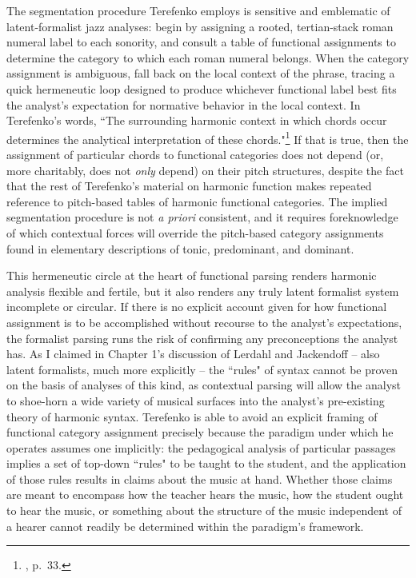 The segmentation procedure Terefenko employs is sensitive and emblematic of latent-formalist jazz analyses: begin by assigning a rooted, tertian-stack roman numeral label to each sonority, and consult a table of functional assignments to determine the category to which each roman numeral belongs.  When the category assignment is ambiguous, fall back on the local context of the phrase, tracing a quick hermeneutic loop designed to produce whichever functional label best fits the analyst's expectation for normative behavior in the local context.  In Terefenko's words, ``The surrounding harmonic context in which chords occur determines the analytical interpretation of these chords."\footnote{\cite{terefenko2014}, p.\ 33.}  If that is true, then the assignment of particular chords to functional categories does not depend (or, more charitably, does not \emph{only} depend) on their pitch structures, despite the fact that the rest of Terefenko's material on harmonic function makes repeated reference to pitch-based tables of harmonic functional categories.  The implied segmentation procedure is not \emph{a priori} consistent, and it requires foreknowledge of which contextual forces will override the pitch-based category assignments found in elementary descriptions of tonic, predominant, and dominant.

This hermeneutic circle at the heart of functional parsing renders harmonic analysis flexible and fertile, but it also renders any truly latent formalist system incomplete or circular.  If there is no explicit account given for how functional assignment is to be accomplished without recourse to the analyst's expectations, the formalist parsing runs the risk of confirming any preconceptions the analyst has.  As I claimed in Chapter 1's discussion of Lerdahl and Jackendoff -- also latent formalists, much more explicitly -- the ``rules" of syntax cannot be proven on the basis of analyses of this kind, as contextual parsing will allow the analyst to shoe-horn a wide variety of musical surfaces into the analyst's pre-existing theory of harmonic syntax.  Terefenko is able to avoid an explicit framing of functional category assignment precisely because the paradigm under which he operates assumes one implicitly: the pedagogical analysis of particular passages implies a set of top-down ``rules" to be taught to the student, and the application of those rules results in claims about the music at hand.  Whether those claims are meant to encompass how the teacher hears the music, how the student ought to hear the music, or something about the structure of the music independent of a hearer cannot readily be determined within the paradigm's framework.%


